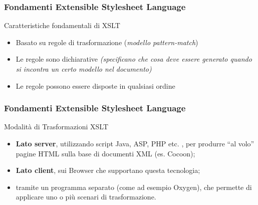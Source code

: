 \begin{frame}
    \frametitle{Fondamenti Extensible Stylesheet Language}
    \addtocounter{nframe}{1}
    

     \begin{block}{Caratteristiche fondamentali di XSLT}
         \begin{itemize}
            \item Basato su regole di trasformazione (\textit{modello pattern-match})
            \item Le regole sono dichiarative \textit{(specificano che cosa deve essere generato quando si incontra un certo modello nel documento)}
            \item Le regole possono essere disposte in qualsiasi ordine
        \end{itemize}
     \end{block}
    
\end{frame}


\begin{frame}
    \frametitle{Fondamenti Extensible Stylesheet Language}
    \addtocounter{nframe}{1}
    

     \begin{block}{Modalità di Trasformazioni XSLT}
         \begin{itemize}
            \item \textbf{Lato server}, utilizzando script Java, ASP, PHP etc. , per produrre “al volo” pagine HTML sulla base di documenti XML (es. Cocoon);
            \item \textbf{Lato client}, sui Browser che supportano questa tecnologia;
            \item tramite un programma separato (come ad esempio Oxygen), che permette di applicare uno o più scenari di trasformazione.
        \end{itemize}
     \end{block}
    
\end{frame}

